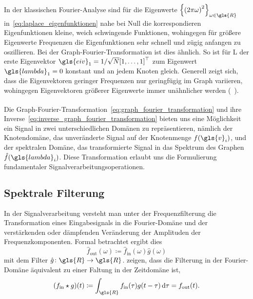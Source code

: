 In der klassischen Fourier-Analyse sind für die Eigenwerte ${\left\{{\left(2\pi \omega\right)}^2\right\}}_{\omega \in \gls{R}}$ in~\eqref{eq:laplace_eigenfunktionen} nahe bei Null die korrespondieren Eigenfunktionen kleine, weich schwingende Funktionen, wohingegen für größere Eigenwerte \bzw{} Frequenzen die Eigenfunktionen sehr schnell und zügig anfangen zu oszillieren.
Bei der Graph-Fourier-Transformation ist dies ähnlich.
So ist für \gls{L} der erste Eigenvektor $\gls{eiv}_1 = 1/\sqrt{N}{\left[1, \ldots, 1\right]}^{\top}$ zum Eigenwert $\gls{lambda}_1 = 0$ konstant und an jedem Knoten gleich.
Generell zeigt sich, dass die Eigenvektoren geringer Frequenzen nur geringfügig im Graph variieren, wohingegen Eigenvektoren größerer Eigenwerte immer unähnlicher werden (\vgl{}~\cite{Shuman}).
\\\\
Die Graph-Fourier-Transformation~\eqref{eq:graph_fourier_transformation} und ihre Inverse~\eqref{eq:inverse_graph_fourier_transformation} bieten uns eine Möglichkeit ein Signal in zwei unterschiedlichen Domänen zu repräsentieren, nämlich der Knotendomäne, \dhe{} das unveränderte Signal auf der Knotenmenge $f\left(\gls{v}_i\right)$, und der spektralen Domäne, \dhe{} das transformierte Signal in das Spektrum des Graphen $\hat f\left(\gls{lambda}_i\right)$.
Diese Transformation erlaubt uns die Formulierung fundamentaler Signalverarbeitungsoperationen.

\subsection{Spektrale Filterung}
\label{spektrale_filterung}

In der Signalverarbeitung versteht man unter der Frequenzfilterung die Transformation eines Eingabesignals in die Fourier-Domäne und der verstärkenden oder dämpfenden Veränderung der Amplituden der Frequenzkomponenten.
Formal betrachtet ergibt dies
\begin{equation}
  \hat f_{\mathrm{out}}\left(\omega\right) \coloneqq \hat f_{\mathrm{in}}\left(\omega\right)\hat g\left(\omega\right)
  \label{eq:fourier_filtering}
\end{equation}
mit dem Filter $\hat g \colon \gls{R} \to \gls{R}$.
\citeauthor{Shuman} zeigen, dass die Filterung in der Fourier-Domäne äquivalent zu einer Faltung in der Zeitdomäne ist, \dhe{}
\begin{equation}
  \left(f_{\mathrm{in}} \star g\right)\left(t\right) \coloneqq \int_{\gls{R}} f_{\mathrm{in}}\left(\tau\right)g\left(t - \tau\right)\, \mathrm{d}\tau = f_{\mathrm{out}}\left(t\right).
  \label{eq:fourier_faltung}
\end{equation}

